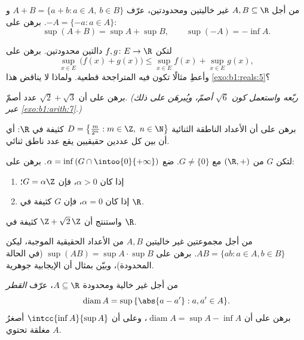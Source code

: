 \begin{exercise}[$\star\star$]\label{exo:b1:reals:5}
من أجل $A, B \subseteq \R$ غير خاليتين ومحدودتين، عرّف $A + B = \{a + b : a
\in A,\ b \in B\}$ و $-A = \{-a : a \in A\}$. برهن على:
\[
\sup(A + B) = \sup A + \sup B,
\qquad
\sup(-A) = -\inf A .
\]
\end{exercise}

\begin{exercise}[$\star\star$]\label{exo:b1:reals:6}
لتكن $f, g \colon E \to \R$ دالتين محدودتين. برهن على
\[
\sup_{x \in E}\, \bigl(f(x) + g(x)\bigr) \leq \sup_{x \in E} f(x) +
\sup_{x \in E} g(x),
\]
وأعطِ مثالًا تكون فيه المتراجحة قطعية. ولماذا لا يناقض هذا
\cref{exo:b1:reals:5}؟
\end{exercise}

\begin{exercise}[$\star\star$]\label{exo:b1:reals:7}
برهن على أن $\sqrt 2 + \sqrt 3$ عدد أصمّ. \emph{(ربّعه واستعمل
كون $\sqrt 6$ أصمّ، ويُبرهَن على ذلك عبر
\cref{exo:b1:arith:7}.)}
\end{exercise}

\begin{exercise}[$\star\star$]\label{exo:b1:reals:8}
برهن على أن  الأعداد الناطقة الثنائية $D = \bigl\{\frac{m}{2^n} : m \in \Z,\ n \in
\N\bigr\}$ كثيفة في $\R$: أي أن بين كل عددين
حقيقيين يقع عدد ناطق ثنائي.
\end{exercise}

\begin{exercise}[$\star\star\star$]\label{exo:b1:reals:9}
لتكن $G$  من $(\R, +)$ مع $G \neq \{0\}$. ضع $\alpha =
\inf\,(G \cap \intoo{0}{+\infty})$. برهن على:
\begin{enumerate}
  \item إذا كان $\alpha > 0$، فإن $G = \alpha\Z$؛
  \item إذا كان $\alpha = 0$، فإن $G$ كثيفة في $\R$.
\end{enumerate}
واستنتج أن $\Z + \sqrt 2\,\Z$ كثيفة في $\R$.
\end{exercise}

\begin{exercise}[$\star\star\star$]\label{exo:b1:reals:10}
من أجل مجموعتين غير خاليتين $A, B$ من الأعداد الحقيقية الموجبة، ليكن $AB = \{ab : a \in
A, b \in B\}$. برهن على $\sup(AB) = \sup A \cdot \sup B$ (في الحالة المحدودة)،
وبيّن بمثال أن الإيجابية جوهرية.
\end{exercise}

\begin{exercise}[$\star\star$]\label{exo:b1:reals:11}
من أجل  غير خالية ومحدودة $A \subseteq \R$، عرّف
\emph{القطر}
\[
\operatorname{diam} A = \sup\,\{\abs{a - a'} : a, a' \in A\} .
\]
برهن على أن $\operatorname{diam} A = \sup A - \inf A$، وعلى أن
$\intcc{\inf A}{\sup A}$ أصغرُ  مغلقة
تحتوي $A$.
\end{exercise}

